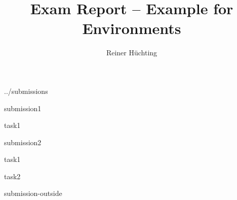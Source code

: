 \documentclass[a4paper]{scrartcl}
\begin{document}
    \title{Exam Report -- Example for Environments}
    \author{Reiner Hüchting}

    \maketitle

    \begin{examreport}{../submissions}
        \begin{submissionreport}{submission1}
            \begin{taskreport}{task1}
            \end{taskreport}
        \end{submissionreport}
        \begin{submissionreport}{submission2}
            \begin{taskreport}{task1}
            \end{taskreport}
            \begin{taskreport}{task2}
            \end{taskreport}
        \end{submissionreport}
    \end{examreport}

    \begin{submissionreport}{submission-outside}
    \end{submissionreport}
\end{document}
